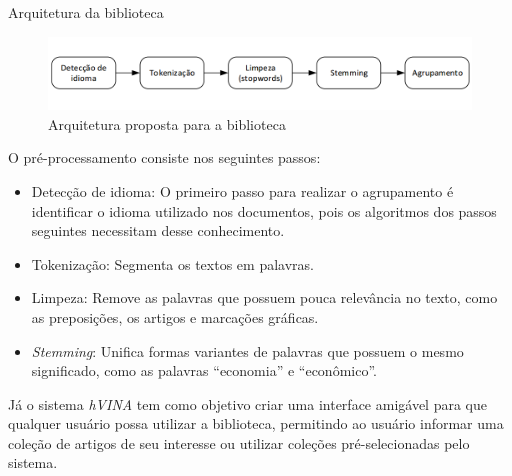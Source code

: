 \documentclass[final]{beamer}
\newlength{\onecolwid}
\newlength{\twocolwid}
\begin{document}
\begin{frame}[t]
\begin{columns}[t]
\begin{column}{\twocolwid}
\begin{columns}[t,totalwidth=\twocolwid]
\begin{column}{\onecolwid}
\begin{block}{Arquitetura da biblioteca}
\begin{figure}
\includegraphics[width=0.95\linewidth]{arquitetura.png}
\caption{Arquitetura proposta para a biblioteca}
\end{figure}

O pré-processamento consiste nos seguintes passos:

\begin{itemize}
\item Detecção de idioma: O primeiro passo para realizar o agrupamento é identificar o idioma utilizado nos documentos, pois os algoritmos dos passos seguintes necessitam desse conhecimento. %
\item Tokenização: Segmenta os textos em palavras.
\item Limpeza: Remove as palavras que possuem pouca relevância no texto, como as preposições, os artigos e marcações gráficas.
\item \textit{Stemming}: Unifica formas variantes de palavras que possuem o mesmo significado, como as palavras ``economia'' e ``econômico''.
\end{itemize}





Já o sistema \textit{hVINA} tem como objetivo criar uma interface amigável para que qualquer usuário possa utilizar a biblioteca, permitindo ao usuário informar uma coleção de artigos de seu interesse ou utilizar coleções pré-selecionadas pelo sistema.


\end{block}


\end{column} %


\end{columns}
\end{column}
\end{columns}
\end{frame}
\end{document}
